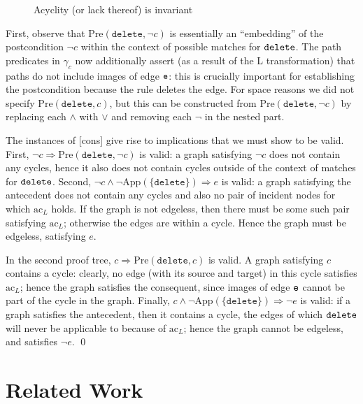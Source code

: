 \documentclass{llncs}
\begin{document}
\begin{example}
\begin{figure}[htb]
		\caption{Acyclity (or lack thereof) is invariant}\label{fig:proof_trees_acyclicity}
	\end{figure}
		
		
	First, observe that $\text{Pre}(\mathtt{delete},\neg c)$ is essentially an ``embedding'' of the postcondition $\neg c$ within the context of possible matches for $\tt delete$. The path predicates in $\gamma_c$ now additionally assert (as a result of the L transformation) that paths do not include images of edge $\tt e$: this is crucially important for establishing the postcondition because the rule deletes the edge. For space reasons we did not specify $\text{Pre}(\mathtt{delete},c)$, but this can be constructed from $\text{Pre}(\mathtt{delete},\neg c)$ by replacing each $\wedge$ with $\vee$ and removing each $\neg$ in the nested part.
	
	The instances of [cons] give rise to implications that we must show to be valid. First, $\neg c \Rightarrow \text{Pre}(\mathtt{delete},\neg c)$ is valid: a graph satisfying $\neg c$ does not contain any cycles, hence it also does not contain cycles outside of the context of matches for $\tt delete$. Second, $\neg c \wedge \neg\text{App}(\{\mathtt{delete}\}) \Rightarrow e$ is valid: a graph satisfying the antecedent does not contain any cycles and also no pair of incident nodes for which $\text{ac}_L$ holds. If the graph is not edgeless, then there must be some such pair satisfying $\text{ac}_L$; otherwise the edges are within a cycle. Hence the graph must be edgeless, satisfying $e$.
	
	In the second proof tree, $c \Rightarrow \text{Pre}(\mathtt{delete},c)$ is valid. A graph satisfying $c$ contains a cycle: clearly, no edge (with its source and target) in this cycle satisfies $\text{ac}_L$; hence the graph satisfies the consequent, since images of edge $\tt e$ cannot be part of the cycle in the graph. Finally, $c \wedge \neg \text{App}(\{\mathtt{delete}\}) \Rightarrow \neg e$ is valid: if a graph satisfies the antecedent, then it contains a cycle, the edges of which $\tt delete$ will never be applicable to because of $\text{ac}_L$; hence the graph cannot be edgeless, and satisfies $\neg e$.
	\qed
	\end{example}
	











	
	\section{Related Work}\label{sec:related_work}
	
\end{document}
